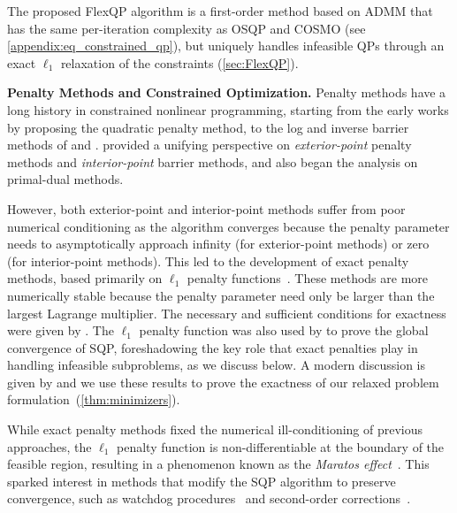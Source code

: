 \documentclass{article} %
\begin{document}
The proposed FlexQP algorithm is a first-order method based on ADMM that has the same
per-iteration complexity as OSQP and COSMO
(see \cref{appendix:eq_constrained_qp}), but uniquely handles infeasible QPs through
an exact $\ell_1$ relaxation of the constraints (\cref{sec:FlexQP}).


\textbf{Penalty Methods and Constrained Optimization.}
Penalty methods have a long history in constrained nonlinear programming, starting from the early works by \citet{Courant1943Variational} proposing the quadratic penalty method, to the log and inverse barrier methods of \citet{Frisch1955Logarithmic} and \citet{Carroll1961Created}. \citet{Fiacco1968Nonlinear} provided a unifying perspective on \emph{exterior-point} penalty methods and \emph{interior-point} barrier methods, and also began the analysis on primal-dual methods.

However, both exterior-point and interior-point methods suffer from poor numerical conditioning as the algorithm converges because the penalty parameter needs to asymptotically approach infinity (for exterior-point methods) or zero (for interior-point methods).
This led to the development of exact penalty methods, based primarily on $\ell_1$ penalty functions~\citep{Eremin1966Penalty,Zangwill1967Nonlinear}.
These methods are more numerically stable because the penalty parameter need only be larger than the largest Lagrange multiplier.
The necessary and sufficient conditions for exactness were given by \citet{Pietrzykowski1969Exact}.
The $\ell_1$ penalty function was also used by \citet{Han1977Globally} to prove the global convergence of SQP, foreshadowing the key role that
exact penalties play in handling infeasible subproblems, as we discuss below.
A modern discussion is given by \citet{nocedal2006numerical} and we use these results to prove the exactness of our relaxed problem formulation~(\cref{thm:minimizers}).

While exact penalty methods fixed the numerical ill-conditioning of previous approaches, the $\ell_1$ penalty function is non-differentiable at the boundary of the feasible region, resulting in a phenomenon known as the \emph{Maratos effect}~\citep{Maratos1978Exact}.
This sparked interest in methods that modify the SQP algorithm to preserve convergence, such as watchdog procedures~\citep{Chamberlain1982Watchdog} and second-order corrections~\citep{Conn1977Penalty,Fletcher1982Model}.
\end{document}
